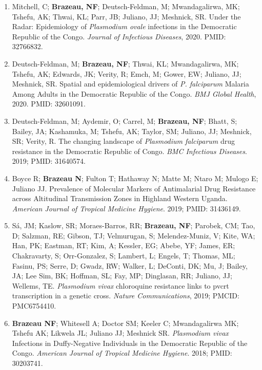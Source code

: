 \documentclass[11pt,letterpaper]{article}
\begin{document}
\begin{enumerate}[leftmargin=*, itemsep=4pt, parsep=0pt]
\item Mitchell, C; \textbf{Brazeau, NF}; Deutsch-Feldman, M; Mwandagalirwa, MK; Tshefu, AK; Thwai, KL; Parr, JB; Juliano, JJ; Meshnick, SR. Under the Radar: Epidemiology of \textit{Plasmodium ovale} infections in the Democratic Republic of the Congo. \textit{Journal of Infectious Diseases}, 2020. PMID: 32766832.

\item Deutsch-Feldman, M; \textbf{Brazeau, NF}; Thwai, KL; Mwandagalirwa, MK; Tshefu, AK; Edwards, JK; Verity, R; Emch, M; Gower, EW; Juliano, JJ; Meshnick, SR. Spatial and epidemiological drivers of \textit{P. falciparum} Malaria Among Adults in the Democratic Republic of the Congo. \textit{BMJ Global Health}, 2020. PMID: 32601091.

\item Deutsch-Feldman, M; Aydemir, O; Carrel, M; \textbf{Brazeau, NF}; Bhatt, S; Bailey, JA; Kashamuka, M; Tshefu, AK; Taylor, SM; Juliano, JJ; Meshnick, SR; Verity, R. The changing landscape of \textit{Plasmodium falciparum} drug resistance in the Democratic Republic of Congo. \textit{BMC Infectious Diseases}. 2019; PMID: 31640574.

\item Boyce R; \textbf{Brazeau N}; Fulton T; Hathaway N; Matte M; Ntaro M; Mulogo E; Juliano JJ. Prevalence of Molecular Markers of Antimalarial Drug Resistance across Altitudinal Transmission Zones in Highland Western Uganda. \textit{American Journal of Tropical Medicine Hygiene}. 2019; PMID: 31436149.

\item Sá, JM; Kaslow, SR; Moraes-Barros, RR; \textbf{Brazeau, NF}; Parobek, CM; Tao, D; Salzman, RE; Gibson, TJ; Velmurugan, S; Melendez-Muniz, V; Kite, WA; Han, PK; Eastman, RT; Kim, A; Kessler, EG; Abebe, YF; James, ER; Chakravarty, S; Orr-Gonzalez, S; Lambert, L; Engels, T; Thomas, ML; Fasinu, PS; Serre, D; Gwadz, RW; Walker, L; DeConti, DK; Mu, J; Bailey, JA; Lee Sim, BK; Hoffman, SL; Fay, MP; Dinglasan, RR; Juliano, JJ; Wellems, TE. \textit{Plasmodium vivax} chloroquine resistance links to pvcrt transcription in a genetic cross. \textit{Nature Communications}, 2019; PMCID: PMC6754410.

\item \textbf{Brazeau NF}; Whitesell A; Doctor SM; Keeler C; Mwandagalirwa MK; Tshefu AK; Likwela JL; Juliano JJ; Meshnick SR. \textit{Plasmodium vivax} Infections in Duffy-Negative Individuals in the Democratic Republic of the Congo. \textit{American Journal of Tropical Medicine Hygiene}. 2018; PMID: 30203741.


\end{enumerate}
\end{document}
